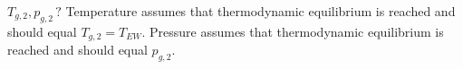 \( T_{g,2}, p_{g,2} \, ? \)  
Temperature assumes that thermodynamic equilibrium is reached and should equal \( T_{g,2} = T_{EW} \).  
Pressure assumes that thermodynamic equilibrium is reached and should equal \( p_{g,2} \).